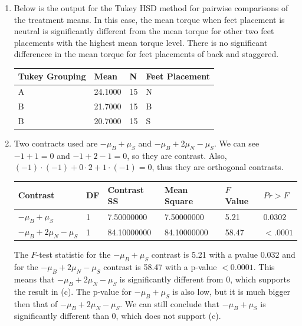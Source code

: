 \documentclass{article}
\begin{document}
\begin{enumerate}[leftmargin = 0 em, label = \arabic*., font = \bfseries]
\begin{enumerate}
\item 
Below is the output for the Tukey HSD method for pairwise comparisons
of the treatment means. In this case, the mean torque when feet placement is neutral is significantly different from the mean torque for other two feet placements with the highest mean torque level. There is no significant differencce in the mean torque for feet placements of back and staggered.

\begin{center}
\begin{tabular}{llll}
\toprule
Tukey Grouping& Mean&N&Feet Placement\\
\midrule
A&24.1000&15&N\\
B&21.7000&15&B\\
B&20.7000&15&S\\
\bottomrule
\end{tabular}
\end{center}

\item 
Two contracts used are $- \mu_B + \mu_S$ and $-\mu_B + 2 \mu_N - \mu_S$. We can see $-1 + 1 = 0$ and $-1 + 2 -1 = 0$, so they are contrast. Also, $(-1)\cdot (-1) + 0 \cdot 2 + 1 \cdot (-1) = 0$, thus they are orthogonal contrasts. 

\begin{center}
	\begin{tabular}{llllll}
	\toprule
Contrast&DF&Contrast SS&Mean Square&$F$ Value&$Pr > F$\\
\midrule
$-\mu_B + \mu_S$&1&7.50000000&7.50000000&5.21&0.0302\\
$-\mu_B + 2 \mu_N - \mu_S$&1&84.10000000&84.10000000&58.47&$<.0001$\\
\bottomrule
	\end{tabular}
\end{center}

The $F$-test statistic for the $-\mu_B + \mu_S$ contrast is 5.21 with a pvalue
$0.032$ and for the $-\mu_B + 2 \mu_N - \mu_S$ contrast is 58.47 with a p-value $<
0.0001$. This means that  $-\mu_B + 2 \mu_N - \mu_S$ is significantly different from 0, which supports the result in (c). The p-value for $-\mu_B + \mu_S$ is also low, but it is much bigger then that of $-\mu_B + 2 \mu_N - \mu_S$. We can still conclude that $-\mu_B + \mu_S$ is significantly different than 0, which does not support (c).



\end{enumerate}
\end{enumerate}
\end{document}
